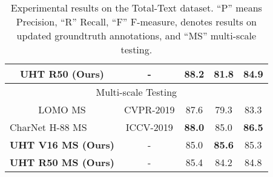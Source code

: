\documentclass[10pt,twocolumn,letterpaper]{article}
\begin{document}
\begin{table}[]
{\begin{tabular}{ccccc}
\multicolumn{1}{c|}{\textbf{UHT R50 (Ours)}} & \multicolumn{1}{c|}{-} & \multicolumn{1}{c|}{88.2} & \multicolumn{1}{c|}{81.8} & 84.9 \\
\hline
\multicolumn{5}{c}{Multi-scale Testing} \\ \hline
\multicolumn{1}{c|}{LOMO MS \cite{lomo-ms}} & \multicolumn{1}{c|}{CVPR-2019} & \multicolumn{1}{c|}{87.6} & \multicolumn{1}{c|}{79.3} & 83.3 \\
\multicolumn{1}{l|}{CharNet H-88 MS \cite{charnet}} & \multicolumn{1}{c|}{ICCV-2019} & \multicolumn{1}{c|}{\textbf{88.0}} & \multicolumn{1}{c|}{85.0} & \textbf{86.5} \\ \hline
\multicolumn{1}{c|}{\textbf{UHT V16 MS (Ours)}} & \multicolumn{1}{c|}{-} & \multicolumn{1}{c|}{85.0} & \multicolumn{1}{c|}{\textbf{85.6}} & 85.3 \\
\multicolumn{1}{c|}{\textbf{UHT R50 MS (Ours)}} & \multicolumn{1}{c|}{-} & \multicolumn{1}{c|}{85.4} & \multicolumn{1}{c|}{84.2} & 84.8
\end{tabular}}
\vspace{0.2cm}
\caption{Experimental results on the Total-Text dataset. 
``P'' means Precision, ``R''  Recall, ``F'' F-measure,  denotes results on updated groundtruth annotations, and  ``MS'' multi-scale testing. }
\label{table_tt}
\end{table}
\end{document}
